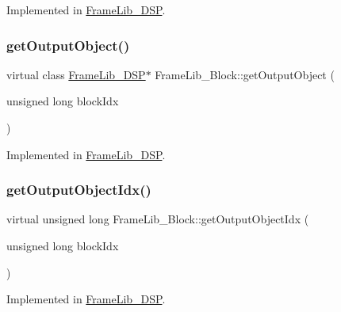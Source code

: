 Implemented in \hyperlink{class_frame_lib___d_s_p_a8ecd5acbe59bf34b514c6e3b73cb518c}{Frame\+Lib\+\_\+\+D\+SP}.

\mbox{\label{class_frame_lib___block_add0b4f01447203f0ffaecb59cfe2c271}} 
\subsubsection{\texorpdfstring{get\+Output\+Object()}{getOutputObject()}}
{\footnotesize\ttfamily virtual class \hyperlink{class_frame_lib___d_s_p}{Frame\+Lib\+\_\+\+D\+SP}$\ast$ Frame\+Lib\+\_\+\+Block\+::get\+Output\+Object (\begin{DoxyParamCaption}\item[{unsigned long}]{block\+Idx }\end{DoxyParamCaption})\hspace{0.3cm}{\ttfamily [pure virtual]}}



Implemented in \hyperlink{class_frame_lib___d_s_p_afdf6c94e0cef2f714bdfd90aea517faf}{Frame\+Lib\+\_\+\+D\+SP}.

\mbox{\label{class_frame_lib___block_ad9e6ffbcf895c3eedc9e9b9c17dd013c}} 
\subsubsection{\texorpdfstring{get\+Output\+Object\+Idx()}{getOutputObjectIdx()}}
{\footnotesize\ttfamily virtual unsigned long Frame\+Lib\+\_\+\+Block\+::get\+Output\+Object\+Idx (\begin{DoxyParamCaption}\item[{unsigned long}]{block\+Idx }\end{DoxyParamCaption})\hspace{0.3cm}{\ttfamily [pure virtual]}}



Implemented in \hyperlink{class_frame_lib___d_s_p_a9eedfc5c69502c9bea3a0c1586a3ac57}{Frame\+Lib\+\_\+\+D\+SP}.


